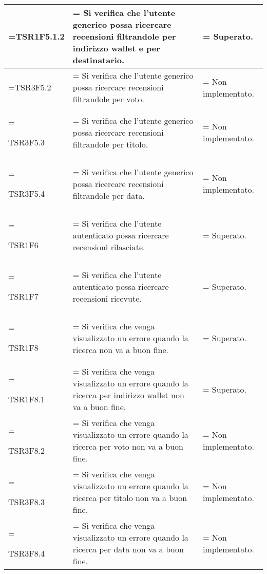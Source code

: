 \begin{xltabular}{\textwidth} {
            >{\hsize\linewidth=\hsize}X
            >{\hsize\linewidth=\hsize}X
            >{\hsize\linewidth=\hsize}X
        }
        TSR1F5.1.2&
        Si verifica che l'utente generico possa ricercare recensioni filtrandole per indirizzo wallet e per destinatario.&
        Superato.
        \\ \hline

        TSR3F5.2&
        Si verifica che l'utente generico possa ricercare recensioni filtrandole per voto.&
        Non implementato.
        \\ \hline
        
        TSR3F5.3&
        Si verifica che l'utente generico possa ricercare recensioni filtrandole per titolo.&
        Non implementato.
        \\ \hline

        TSR3F5.4&
        Si verifica che l'utente generico possa ricercare recensioni filtrandole per data.&
        Non implementato.
        \\ \hline

        TSR1F6&
        Si verifica che l'utente autenticato possa ricercare recensioni rilasciate. &
        Superato.
        \\ \hline

        TSR1F7&
        Si verifica che l'utente autenticato possa ricercare recensioni ricevute. &
        Superato.
        \\ \hline
        
        TSR1F8&
        Si verifica che venga visualizzato un errore quando la ricerca non va a buon fine. &
        Superato.
        \\ \hline

        TSR1F8.1&
        Si verifica che venga visualizzato un errore quando la ricerca per indirizzo wallet non va a buon fine. &
        Superato.
        \\ \hline
        
        TSR3F8.2&
        Si verifica che venga visualizzato un errore quando la ricerca per voto non va a buon fine. &
        Non implementato.
        \\ \hline
        
        TSR3F8.3&
        Si verifica che venga visualizzato un errore quando la ricerca per titolo non va a buon fine. &
        Non implementato.
        \\ \hline

        TSR3F8.4&
        Si verifica che venga visualizzato un errore quando la ricerca per data non va a buon fine. &
        Non implementato.
        \\ \hline


\end{xltabular}
